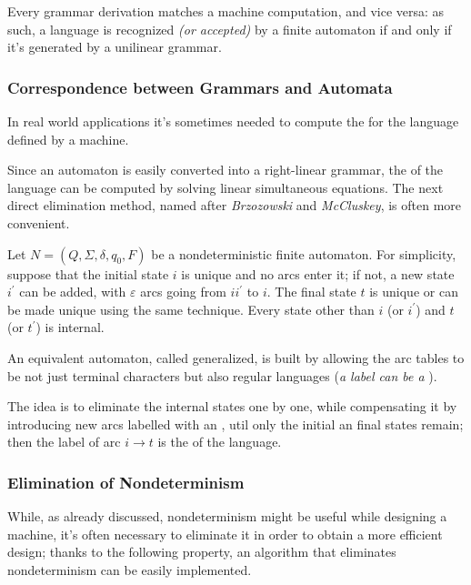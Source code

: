 \documentclass[english]{article}
\begin{document}
Every grammar derivation matches a machine computation, and vice versa:
as such, a language is recognized \textit{(or accepted)} by a finite automaton if and only if it's generated by a unilinear grammar.

\subsubsection{Correspondence between Grammars and Automata}

In real world applications it's sometimes needed to compute the \re for the language defined by a machine.

Since an automaton is easily converted into a right-linear grammar, the \re of the language can be computed by solving linear simultaneous equations.
The next direct elimination method, named \BMC after \textit{Brzozowski} and \textit{McCluskey}, is often more convenient.

\begin{definition}
  \label{def:brzozowski-mccluskey-algorithm}
  Let \(N = \left( Q, \Sigma, \delta, q_0, F \right)\) be a nondeterministic finite automaton.
  For simplicity, suppose that the initial state \(i\) is unique and no arcs enter it;
  if not, a new state \(i^\prime\) can be added, with \(\varepsilon\) arcs going from \(ii^\prime\) to \(i\).
  The final state \(t\) is unique or can be made unique using the same technique.
  Every state other than \(i\) (or \(i^\prime\)) and \(t\) (or \(t^\prime\)) is internal.

  An equivalent automaton, called generalized, is built by allowing the arc tables to be not just terminal characters but also regular languages (\textit{a label can be a \re}).

  The idea is to eliminate the internal states one by one, while compensating it by introducing new arcs labelled with an \re, util only the initial an final states remain;
  then the label of arc \(i \rightarrow t\) is the \re of the language.
\end{definition}

\subsubsection{Elimination of Nondeterminism}
\label{sec:elimination-of-nondeterminism}

While, as already discussed, nondeterminism might be useful while designing a machine, it's often necessary to eliminate it in order to obtain a more efficient design;
thanks to the following property, an algorithm that eliminates nondeterminism can be easily implemented.
\end{document}
